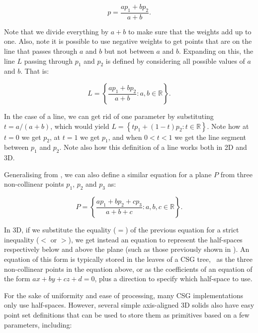 \begin{equation}
p = \frac{a p_1 + b p_2}{a+b}.
\end{equation}

Note that we divide everything by \(a+b\) to make sure that the weights add up to one.
Also, note it is possible to use negative weights to get points that are on the line that passes through \(a\) and \(b\) but not between \(a\) and \(b\).
Expanding on this, the line \(L\) passing through \(p_1\) and \(p_2\) is defined by considering all possible values of \(a\) and \(b\).
That is:

\begin{equation}
\label{eq:line}
L = \left\{ \frac{a p_1 + b p_2}{a+b} : a,b \in \mathbb{R} \right\}.
\end{equation}

In the case of a line, we can get rid of one parameter by substituting \(t = a/(a+b)\), which would yield \(L = \left\{ t p_1 + (1-t) p_2 : t \in \mathbb{R} \right\} \).
Note how at \(t = 0\) we get \(p_2\), at \(t = 1\) we get \(p_1\), and when \(0 < t < 1\) we get the line segment between \(p_1\) and \(p_2\).
Note also how this definition of a line works both in 2D and 3D.

Generalising from , we can also define a similar equation for a plane \(P\) from three non-collinear points \(p_1\), \(p_2\) and \(p_3\) as:

\begin{equation}
P = \left\{ \frac{a p_1 + b p_2 + c p_3}{a+b+c} : a,b,c \in \mathbb{R} \right\}.
\end{equation}

In 3D, if we substitute the equality (\(=\)) of the previous equation for a strict inequality (\(<\) or \(>\)), we get instead an equation to represent the half-spaces respectively below and above the plane (such as those previously shown in ).
An equation of this form is typically stored in the leaves of a CSG tree, \eg\ as the three non-collinear points in the equation above, or as the coefficients of an equation of the form \(ax + by + cz + d = 0 \), plus a direction to specify which half-space to use.

For the sake of uniformity and ease of processing, many CSG implementations only use half-spaces.
However, several simple axis-aligned 3D solids also have easy point set definitions that can be used to store them as primitives based on a few parameters, including:

